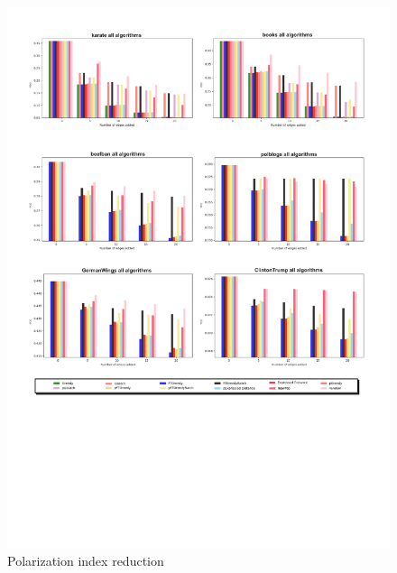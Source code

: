 \begin{figure}[!htbp]
	\begin{center}
	\advance\leftskip-1.5cm
	\captionsetup{justification=centering,margin=2cm}
	\includegraphics[width=1.2\textwidth]{Figures/all 6}
	\caption{Polarization index reduction}
	\label{m2}
	\end{center}
\end{figure}

